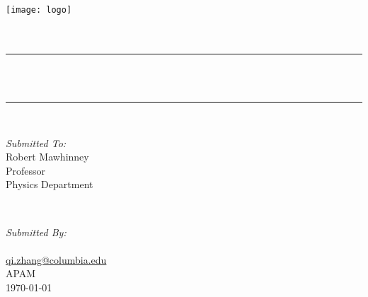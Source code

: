 \begin{titlepage}
    \centering
    \vspace*{0.5 cm}
    \texttt{[image: logo]}\\[1.0 cm]
    \textsc{\LARGE \institution}\\[2.0 cm]
    \textsc{\Large \thetitle}\\[0.5 cm]
    \rule{\linewidth}{0.2 mm}\\[0.4 cm]
    {\huge \bfseries \thetitle}\\
    \rule{\linewidth}{0.2 mm}\\[1.5 cm]

    \begin{minipage}{0.4\textwidth}
        \begin{flushleft} \large
            \emph{Submitted To:}\\
            Robert Mawhinney\\
            Professor\\
            Physics Department\\
        \end{flushleft}
    \end{minipage}~
    \begin{minipage}{0.4\textwidth}
        \begin{flushright} \large
            \emph{Submitted By:} \\
            \theauthor\\
            \href{mailto:qi.zhang@columbia.edu}{qi.zhang@columbia.edu}\\
            APAM\\
            \today\\
        \end{flushright}
    \end{minipage}\\[2 cm]
\end{titlepage}

\newpage
